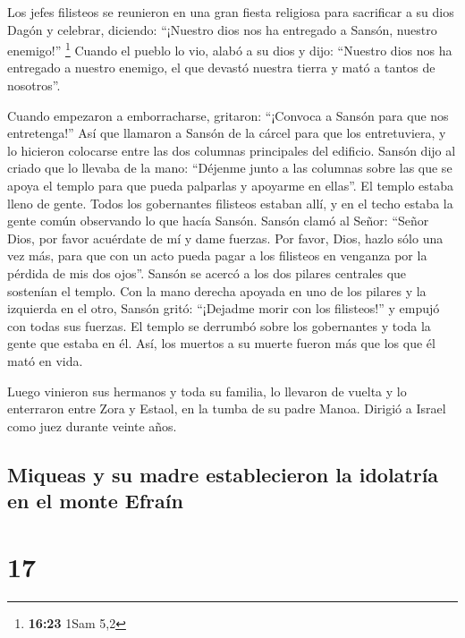  Los jefes filisteos se reunieron en una gran fiesta
religiosa para sacrificar a su dios Dagón y celebrar, diciendo:
``¡Nuestro dios nos ha entregado a Sansón, nuestro enemigo!''
\footnote{\textbf{16:23} 1Sam 5,2}  Cuando el pueblo lo
vio, alabó a su dios y dijo: ``Nuestro dios nos ha entregado a nuestro
enemigo, el que devastó nuestra tierra y mató a tantos de nosotros''.

 Cuando empezaron a emborracharse, gritaron: ``¡Convoca a
Sansón para que nos entretenga!'' Así que llamaron a Sansón de la cárcel
para que los entretuviera, y lo hicieron colocarse entre las dos
columnas principales del edificio.  Sansón dijo al criado
que lo llevaba de la mano: ``Déjenme junto a las columnas sobre las que
se apoya el templo para que pueda palparlas y apoyarme en ellas''.
 El templo estaba lleno de gente. Todos los gobernantes
filisteos estaban allí, y en el techo estaba la gente común observando
lo que hacía Sansón.  Sansón clamó al Señor: ``Señor
Dios, por favor acuérdate de mí y dame fuerzas. Por favor, Dios, hazlo
sólo una vez más, para que con un acto pueda pagar a los filisteos en
venganza por la pérdida de mis dos ojos''.  Sansón se
acercó a los dos pilares centrales que sostenían el templo. Con la mano
derecha apoyada en uno de los pilares y la izquierda en el otro,
 Sansón gritó: ``¡Dejadme morir con los filisteos!'' y
empujó con todas sus fuerzas. El templo se derrumbó sobre los
gobernantes y toda la gente que estaba en él. Así, los muertos a su
muerte fueron más que los que él mató en vida.

 Luego vinieron sus hermanos y toda su familia, lo
llevaron de vuelta y lo enterraron entre Zora y Estaol, en la tumba de
su padre Manoa. Dirigió a Israel como juez durante veinte años.

\hypertarget{miqueas-y-su-madre-establecieron-la-idolatruxeda-en-el-monte-efrauxedn}{%
\subsection{Miqueas y su madre establecieron la idolatría en el monte
Efraín}\label{miqueas-y-su-madre-establecieron-la-idolatruxeda-en-el-monte-efrauxedn}}

\hypertarget{section-16}{%
\section{17}\label{section-16}}

